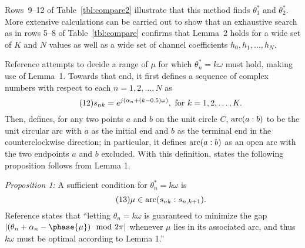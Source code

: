 Rows~9--12 of Table~\ref{tbl:compare2} illustrate that this method finds $\theta_1^*$ and $\theta_2^*$.
More extensive calculations can be carried out to show that an exhaustive search as in rows 5--8 of
Table~\ref{tbl:compare} confirms that Lemma~2 holds for a wide set of $K$ and $N$ values as well as
a wide set of channel coefficients $h_0, h_1, \ldots, h_N$.

Reference \cite{b1} attempts to decide a range of $\mu$ for which $\theta_n^* = k\omega$ must hold,
making use of Lemma~1. Towards that end, it first defines a sequence of complex numbers with respect to
each $n=1,2,\ldots,N$ as
\begin{equation}\tag{12}
s_{nk} = e^{j(\alpha_n+(k-0.5)\omega)},\ {\rm for}\ k=1,2,\ldots,K.
\end{equation}
Then, \cite{b1} defines, for any two points $a$ and $b$ on the unit circle $C$, ${\rm arc}(a:b)$
to be the unit circular arc with $a$ as the initial end and $b$ as the terminal end in the counterclockwise
direction; in particular, it defines ${\rm arc}(a:b)$ as an open arc with the two endpoints $a$ and $b$
excluded. With this definition, \cite{b1} states the following proposition follows from Lemma 1.

{\em Proposition 1:\/} A sufficient condition for $\theta_n^*=k\omega$ is
\begin{equation}\tag{13}
\mu \in {\rm arc} (s_{nk}:s_{n,k+1}).
\end{equation}
Reference \cite{b1} states that ``letting $\theta_n = k\omega$ is guaranteed to minimize the gap
$|(\theta_n+\alpha_n-\phase{\mu}) \mod 2\pi |$ whenever $\mu$ lies in its associated arc, and thus
$k\omega$ must be optimal according to Lemma 1.''

